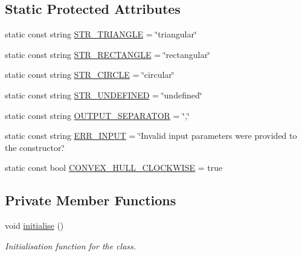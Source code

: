 \subsection*{Static Protected Attributes}
\begin{DoxyCompactItemize}
\item 
static const string \hyperlink{classmultiscale_1_1analysis_1_1SpatialEntityPseudo3D_a8ad67f0073da808ad1badedf2e613ed3}{S\-T\-R\-\_\-\-T\-R\-I\-A\-N\-G\-L\-E} = \char`\"{}triangular\char`\"{}
\item 
static const string \hyperlink{classmultiscale_1_1analysis_1_1SpatialEntityPseudo3D_a9b80a7c37a8c82fed02a1e23b1173843}{S\-T\-R\-\_\-\-R\-E\-C\-T\-A\-N\-G\-L\-E} = \char`\"{}rectangular\char`\"{}
\item 
static const string \hyperlink{classmultiscale_1_1analysis_1_1SpatialEntityPseudo3D_a561e862c97a4717eb5b4977c55d05d90}{S\-T\-R\-\_\-\-C\-I\-R\-C\-L\-E} = \char`\"{}circular\char`\"{}
\item 
static const string \hyperlink{classmultiscale_1_1analysis_1_1SpatialEntityPseudo3D_ae4e33ad9bcad430b929b601c5571a6fd}{S\-T\-R\-\_\-\-U\-N\-D\-E\-F\-I\-N\-E\-D} = \char`\"{}undefined\char`\"{}
\item 
static const string \hyperlink{classmultiscale_1_1analysis_1_1SpatialEntityPseudo3D_a4ee08be9b4119b90f0a996704d179635}{O\-U\-T\-P\-U\-T\-\_\-\-S\-E\-P\-A\-R\-A\-T\-O\-R} = \char`\"{},\char`\"{}
\item 
static const string \hyperlink{classmultiscale_1_1analysis_1_1SpatialEntityPseudo3D_a5882e2e18343ccee821f1bd6b9c23724}{E\-R\-R\-\_\-\-I\-N\-P\-U\-T} = \char`\"{}Invalid input parameters were provided to the constructor.\char`\"{}
\item 
static const bool \hyperlink{classmultiscale_1_1analysis_1_1SpatialEntityPseudo3D_ad92f43d2b14c77def3f7a70b54810dd2}{C\-O\-N\-V\-E\-X\-\_\-\-H\-U\-L\-L\-\_\-\-C\-L\-O\-C\-K\-W\-I\-S\-E} = true
\end{DoxyCompactItemize}
\subsection*{Private Member Functions}
\begin{DoxyCompactItemize}
\item 
void \hyperlink{classmultiscale_1_1analysis_1_1SpatialEntityPseudo3D_a097edef313aee62069e36a13c8781d07}{initialise} ()
\begin{DoxyCompactList}\small\item\em Initialisation function for the class. \end{DoxyCompactList}\end{DoxyCompactItemize}


